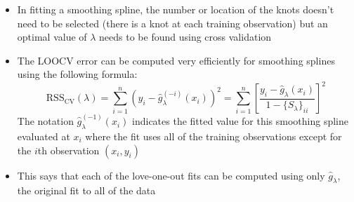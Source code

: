 \documentclass[12pt]{article}
\begin{document}
\begin{itemize}
\item In fitting a smoothing spline, the number or location of the knots doesn't need to be selected (there is a knot at each training observation) but an optimal value of $\lambda$ needs to be found using cross validation
\item The LOOCV error can be computed very efficiently for smoothing splines using the following formula: $$ \text{RSS}_{\text{CV}}(\lambda) = \sum_{i=1}^n (y_i - \hat{g}_\lambda^{(-i)}(x_i))^2 = \sum_{i=1}^n \left[ \frac{y_i - \hat{g}_\lambda(x_i)}{1 - \{S_\lambda\}_{ii}} \right]^2 $$ 
The notation $\hat{g}^{(-1)}_\lambda(x_i)$ indicates the fitted value for this smoothing spline evaluated at $x_i$ where the fit uses all of the training observations except for the $i$th observation $(x_i,y_i)$
\item This says that each of the love-one-out fits can be computed using only $\hat{g}_\lambda$, the original fit to all of the data 
\end{itemize} 
\end{document}
